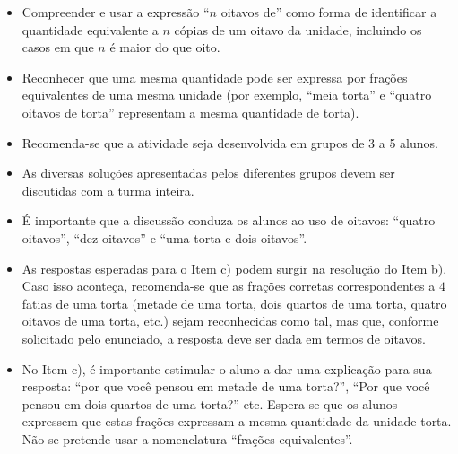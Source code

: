 \begin{multicols}{2}
\begin{objetivos}[label=chap2-ativ4]{}{}
\begin{itemize} %
\item Compreender e usar a expressão ``$n$ oitavos de'' como forma de identificar a quantidade equivalente a $n$ cópias de um oitavo da unidade, incluindo os casos em que $n$ é maior do que oito.
\item Reconhecer que uma mesma quantidade pode ser expressa por frações equivalentes de uma mesma unidade (por exemplo, ``meia torta'' e ``quatro oitavos de torta'' representam a mesma quantidade de torta).
\end{itemize} %
\end{objetivos}

\begin{orientacoes}{}{}

\begin{itemize} %
    \item Recomenda-se que a atividade seja desenvolvida em grupos de 3 a 5 alunos.
    \item As diversas soluções apresentadas pelos diferentes grupos devem ser discutidas com a turma inteira.
    \item É importante que a discussão conduza os alunos ao uso de oitavos:  ``quatro oitavos'', ``dez oitavos'' e ``uma torta e dois oitavos''.
     \item As respostas esperadas para o Item c) podem surgir na resolução do Item b). Caso isso aconteça, recomenda-se que as frações corretas correspondentes a $4$ fatias de uma torta (metade de uma torta, dois quartos de uma torta, quatro oitavos de uma torta, etc.) sejam reconhecidas como tal, mas que, conforme solicitado pelo enunciado, a resposta deve ser dada em termos de oitavos.
     \item No Item c), é importante estimular o aluno a dar uma explicação para sua resposta: ``por que você pensou em metade de uma torta?'', ``Por que você pensou em dois quartos de uma torta?'' etc. Espera-se que os alunos expressem que estas frações expressam a mesma quantidade da unidade torta. Não se pretende usar a nomenclatura ``frações equivalentes''.
\end{itemize}





\end{orientacoes}
\end{multicols}
